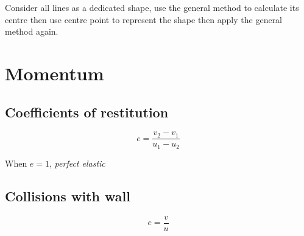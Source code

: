 \documentclass[a4paper,9pt]{scrartcl}
\begin{document}
    Consider all lines as a dedicated shape, use the general method to calculate its centre then use centre point to represent the shape then apply the general method again.


    \section{Momentum}

    \subsection{Coefficients of restitution}

    \begin{displaymath}
        e = \frac{v_2-v_1}{u_1-u_2}
    \end{displaymath}

    When $e=1$, \textit{perfect elastic}

    \subsection{Collisions with wall}

    \begin{displaymath}
        e = \frac{v}{u}
    \end{displaymath}
\end{document}
